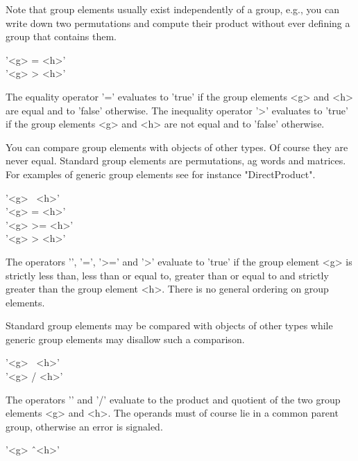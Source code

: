 Note  that group elements  usually  exist independently of a group, e.g.,
you  can write down two  permutations and  compute  their product without
ever defining a group that contains them.

%
%

'<g> = <h>' \\
'<g> \<> <h>'

The equality operator '=' evaluates to 'true'  if the group  elements <g>
and  <h> are  equal and  to 'false' otherwise.   The  inequality operator
'\<>' evaluates to 'true' if the group elements <g> and <h> are not equal
and to 'false' otherwise.

You can  compare group elements with objects  of other types.   Of course
they are never equal.  Standard group elements are permutations, ag words
and  matrices.  For examples of  generic group elements see for  instance
"DirectProduct".

\vspace{5mm}
'<g> \<\ <h>' \\
'<g> \<= <h>' \\
'<g> >= <h>' \\
'<g> > <h>'

The operators '\<', '\<=', '>=' and '>' evaluate to 'true'  if  the group
element <g> is strictly less than, less than or equal to, greater than or
equal to  and strictly greater than the  group element <h>.  There  is no
general ordering on group  elements.

Standard group elements may be compared with objects of other types while
generic group elements may disallow such a comparison.


'<g> \*\ <h>'%
\\
'<g> / <h>'%

The operators  '\*' and '/' evaluate to the product and quotient  of  the
two group elements <g> and <h>.   The  operands  must of course  lie in a
common parent group, otherwise an error is signaled.

\vspace{5mm}
'<g> \^\ <h>'%

